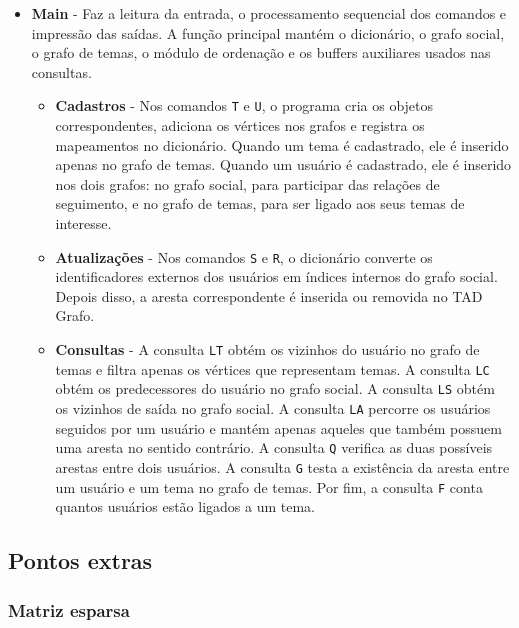 \documentclass[12pt,a4paper]{article}
\begin{document}
\begin{itemize}
    \item \textbf{Main} - Faz a leitura da entrada, o processamento sequencial
    dos comandos e impressão das saídas. A função principal mantém o dicionário, o grafo
    social, o grafo de temas, o módulo de ordenação e os buffers auxiliares usados nas
    consultas.

    \begin{itemize}
        \item \textbf{Cadastros} - Nos comandos \texttt{T} e
        \texttt{U}, o programa cria os objetos correspondentes, adiciona os vértices nos
        grafos e registra os mapeamentos no dicionário. Quando um tema é cadastrado, ele é
        inserido apenas no grafo de temas. Quando um usuário é cadastrado, ele é inserido
        nos dois grafos: no grafo social, para participar das relações de seguimento, e no
        grafo de temas, para ser ligado aos seus temas de interesse.

        \item \textbf{Atualizações} - Nos comandos \texttt{S} e
        \texttt{R}, o dicionário converte os identificadores externos dos usuários em
        índices internos do grafo social. Depois disso, a aresta correspondente é inserida ou
        removida no TAD Grafo.

        \item \textbf{Consultas} - A consulta \texttt{LT} obtém os
        vizinhos do usuário no grafo de temas e filtra apenas os vértices que representam
        temas. A consulta \texttt{LC} obtém os predecessores do usuário no grafo social.
        A consulta \texttt{LS} obtém os vizinhos de saída no grafo social. A consulta
        \texttt{LA} percorre os usuários seguidos por um usuário e mantém apenas aqueles
        que também possuem uma aresta no sentido contrário. A consulta \texttt{Q}
        verifica as duas possíveis arestas entre dois usuários. A consulta \texttt{G}
        testa a existência da aresta entre um usuário e um tema no grafo de temas. Por
        fim, a consulta \texttt{F} conta quantos usuários estão ligados a um tema.
    \end{itemize}
\end{itemize}

\subsection{Pontos extras}

\subsubsection{Matriz esparsa}
\end{document}
